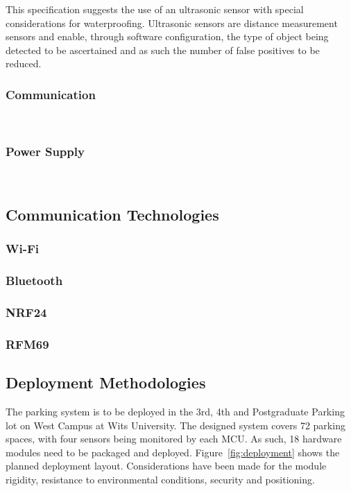 \documentclass[10pt,twocolumn]{witseiepaper}
\begin{document}
			This specification suggests the use of an ultrasonic sensor with special considerations for waterproofing. Ultrasonic sensors are distance measurement sensors and enable, through software configuration, the type of object being detected to be ascertained and as such the number of false positives to be reduced.		
			
		\subsubsection{Communication} $   $
			
		\subsubsection{Power Supply} $   $
	
	\subsection{Communication Technologies}
		\subsubsection{Wi-Fi}
		\subsubsection{Bluetooth}
		\subsubsection{NRF24}
		\subsubsection{RFM69}
	
	\subsection{Deployment Methodologies}
		The parking system is to be deployed in the 3rd, 4th and Postgraduate Parking lot on West Campus at Wits University. The designed system covers 72 parking spaces, with four sensors being monitored by each MCU. As such, 18 hardware modules need to be packaged and deployed. Figure~\ref{fig:deployment} shows the planned deployment layout. Considerations have been made for the module rigidity, resistance to environmental conditions, security and positioning.
		
\end{document}
